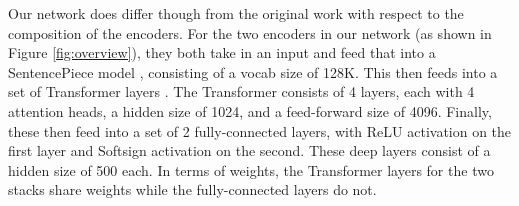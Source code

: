 \documentclass[11pt]{article}
\begin{document}
Our network does differ though from the original work with respect to the composition of the encoders.
For the two encoders in our network (as shown in Figure \ref{fig:overview}), they both take in an input and feed that into a SentencePiece model \cite{kudo2018}, consisting of a vocab size of 128K.
This then feeds into a set of Transformer layers \cite{vaswani2017}.
The Transformer consists of 4 layers, each with 4 attention heads, a hidden size of 1024, and a feed-forward size of 4096.
Finally, these then feed into a set of 2 fully-connected layers, with ReLU activation on the first layer and Softsign activation on the second.
These deep layers consist of a hidden size of 500 each.
In terms of weights, the Transformer layers for the two stacks share weights while the fully-connected layers do not.







\end{document}
